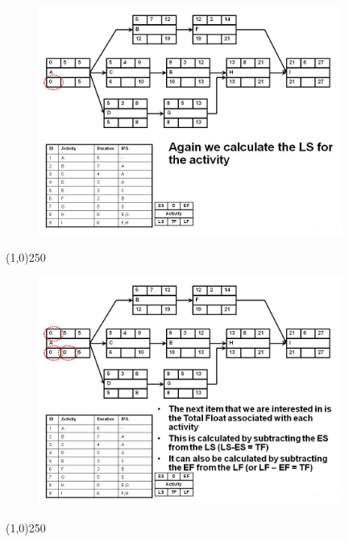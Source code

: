 \begin{frame}
\begin{figure}
	\centering
		\includegraphics[width = 10.0cm]{oldnotes/Slide160.jpg}
\end{figure}
\end{frame}
\begin{center}\line(1,0){250}\end{center}




\begin{frame}
\begin{figure}
	\centering
		\includegraphics[width = 10.0cm]{oldnotes/Slide161.jpg}
\end{figure}
\end{frame}
\begin{center}\line(1,0){250}\end{center}





